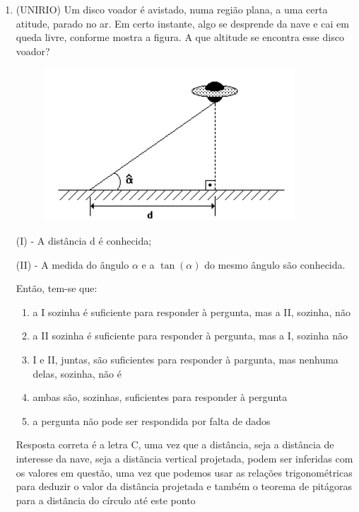 \begin{multicols*}{2}
\begin{enumerate}[wide, labelwidth=!, labelindent=0pt]
        \item (UNIRIO) Um disco voador é avistado, numa região plana, a uma certa atitude, parado no ar. Em certo instante, algo se desprende da nave e cai em queda livre, conforme mostra a figura. A que altitude se encontra esse disco voador?
              \begin{figure}[H]
                  \centering
                  \includegraphics[scale=0.45]{assets/rafael/img40.png}
              \end{figure}
              (I) - A distância d é conhecida;

              (II) - A medida do ângulo $\alpha$ e a $\tan(\alpha)$ do mesmo ângulo são conhecida.

              Então, tem-se que:
              \begin{enumerate}
                  \item a I sozinha é suficiente para responder à pergunta, mas a II, sozinha, não
                  \item a II sozinha é suficiente para responder à pergunta, mas a I, sozinha não
                  \item I e II, juntas, são suficientes para responder à pargunta, mas nenhuma delas, sozinha, não é
                  \item ambas são, sozinhas, suficientes para responder à pergunta
                  \item a pergunta não pode ser respondida por falta de dados
              \end{enumerate}
              Resposta correta é a letra C, uma vez que a distância, seja a distância de interesse da nave, seja a distãncia vertical projetada, podem ser inferidas com os valores em questão, uma vez que podemos usar as relações trigonométricas para deduzir o valor da distância projetada e também o teorema de pitágoras para a distãncia do círculo até este ponto
    \end{enumerate}


    

    

\end{multicols*}